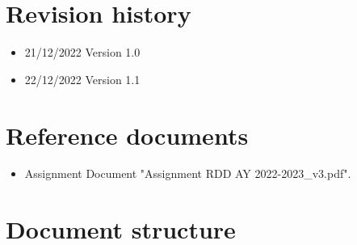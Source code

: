\documentclass[a4paper]{report}
\begin{document}
\section{Revision history}
\begin{itemize}
\item 21/12/2022 Version 1.0
\item 22/12/2022 Version 1.1
\end{itemize}
\section{Reference documents}
\begin{itemize}
\item Assignment Document "Assignment RDD AY 2022-2023\_v3.pdf".
\end{itemize}
\section{Document structure}
\end{document}

